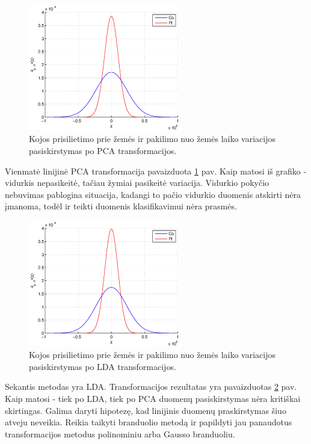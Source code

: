 \documentclass[]{vgtuef}
\begin{document}
\begin{figure}[!t]
  \centering
  \includegraphics[width=250px]{figures/st_sw_linear_kpca.eps}
  \caption{Kojos prisilietimo prie žemės ir pakilimo nuo žemės laiko
    variacijos pasiskirstymas po PCA transformacijos.}
  \label{fig:linear_pca}
\end{figure}

Vienmatė linijinė PCA transformacija pavaizduota \ref{fig:linear_pca} pav. Kaip matosi iš grafiko - vidurkis nepasikeitė, tačiau žymiai pasikeitė variacija. Vidurkio pokyčio nebuvimas pablogina situacija, kadangi to pačio vidurkio duomenis atskirti nėra įmanoma, todėl ir teikti duomenis klasifikavimui nėra prasmės.

\begin{figure}[!t]
  \centering
  \includegraphics[width=250px]{figures/st_sw_linear_lda.eps}
  \caption{Kojos prisilietimo prie žemės ir pakilimo nuo žemės laiko
    variacijos pasiskirstymas po LDA transformacijos.}
  \label{fig:linear_lda}
\end{figure}

Sekantis metodas yra LDA. Transformacijos rezultatas yra pavaizduotas \ref{fig:linear_lda} pav. Kaip matosi - tiek po LDA, tiek po PCA duomenų pasiskirstymas nėra kritiškai skirtingas. Galima daryti hipotezę, kad linijinis duomenų praskirstymas šiuo atveju neveikia. Reikia taikyti branduolio metodą ir papildyti jau panaudotus transformacijos metodus polinominiu arba Gausso branduoliu.
\end{document}
